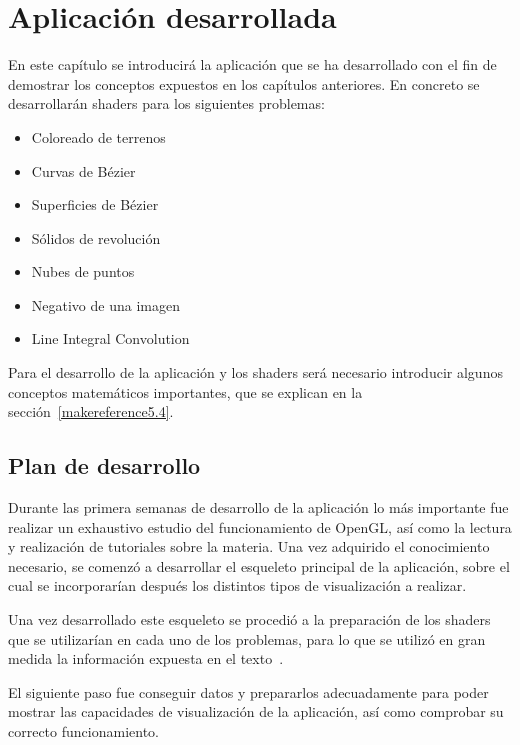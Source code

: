 \cleardoublepage

\chapter{Aplicación desarrollada}
\label{makereference5}

En este capítulo se introducirá la aplicación que se ha desarrollado con el
fin de demostrar los conceptos expuestos en los capítulos anteriores. En
concreto se desarrollarán shaders para los siguientes problemas:

\begin{itemize}
		\item Coloreado de terrenos
		\item Curvas de Bézier
		\item Superficies de Bézier
		\item Sólidos de revolución
		\item Nubes de puntos
		\item Negativo de una imagen
		\item Line Integral Convolution
\end{itemize}

Para el desarrollo de la aplicación y los shaders será necesario introducir
algunos conceptos matemáticos importantes, que se explican en la
sección~\ref{makereference5.4}.

\section{Plan de desarrollo}
\label{makereference5.1}

Durante las primera semanas de desarrollo de la aplicación lo más importante fue
realizar un exhaustivo estudio del funcionamiento de OpenGL, así como la lectura
y realización de tutoriales sobre la materia. Una vez adquirido el conocimiento
necesario, se comenzó a desarrollar el esqueleto principal de la aplicación,
sobre el cual se incorporarían después los distintos tipos de visualización a
realizar.

Una vez desarrollado este esqueleto se procedió a la preparación de los shaders
que se utilizarían en cada uno de los problemas, para lo que se utilizó en gran
medida la información expuesta en el texto~\citet{Bailey}.

El siguiente paso fue conseguir datos y prepararlos adecuadamente para poder
mostrar las capacidades de visualización de la aplicación, así como comprobar su
correcto funcionamiento.

